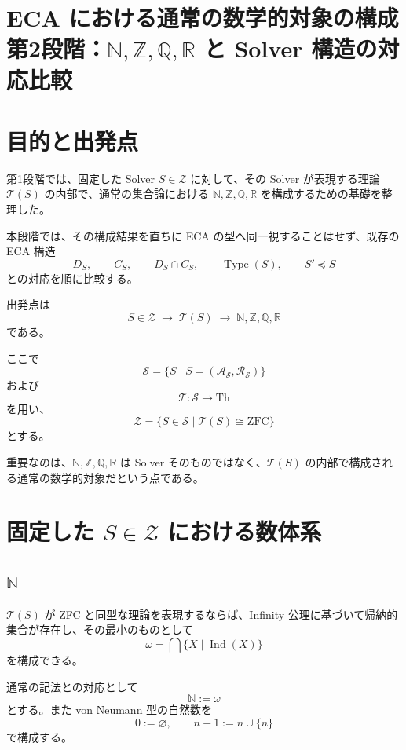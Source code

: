 \documentclass[a4paper,11pt]{article}
\newcommand{\N}{\mathbb{N}}
\newcommand{\Z}{\mathbb{Z}}
\newcommand{\Q}{\mathbb{Q}}
\newcommand{\R}{\mathbb{R}}
\newcommand{\Type}{\operatorname{Type}}
\begin{document}
\section{ECA における通常の数学的対象の構成 \large{第2段階：$\N,\Z,\Q,\R$ と Solver 構造の対応比較}}


\section{目的と出発点}


第1段階では、固定した Solver $S\in\mathcal{Z}$ に対して、その Solver が表現する理論
$\mathcal{T}(S)$ の内部で、通常の集合論における
$\N,\Z,\Q,\R$ を構成するための基礎を整理した。

本段階では、その構成結果を直ちに ECA の型へ同一視することはせず、既存の ECA 構造
\[
D_S,\qquad C_S,\qquad D_S\cap C_S,\qquad \Type(S),\qquad S'\preceq S
\]
との対応を順に比較する。

出発点は
\[
\boxed{
S\in\mathcal{Z}
\;\longrightarrow\;
\mathcal{T}(S)
\;\longrightarrow\;
\N,\Z,\Q,\R
}
\]
である。

ここで
\[
\mathcal{S}=\{S\mid S=(\mathcal{A_S},\mathcal{R_S})\}
\]
および
\[
\mathcal{T}:\mathcal{S}\to\mathrm{Th}
\]
を用い、
\[
\mathcal{Z}
=
\{S\in\mathcal{S}\mid\mathcal{T}(S)\cong\mathrm{ZFC}\}
\]
とする。

重要なのは、$\N,\Z,\Q,\R$ は Solver そのものではなく、$\mathcal{T}(S)$ の内部で構成される通常の数学的対象だという点である。


\section{固定した $S\in\mathcal{Z}$ における数体系}

\subsection{$\N$}

$\mathcal{T}(S)$ が ZFC と同型な理論を表現するならば、Infinity 公理に基づいて帰納的集合が存在し、その最小のものとして
\[
\omega
=
\bigcap\{X\mid \operatorname{Ind}(X)\}
\]
を構成できる。

通常の記法との対応として
\[
\N:=\omega
\]
とする。また von Neumann 型の自然数を
\[
0:=\varnothing,
\qquad
n+1:=n\cup\{n\}
\]
で構成する。
\end{document}
